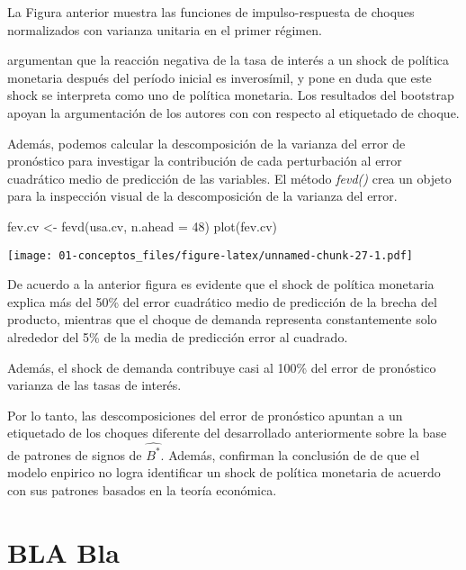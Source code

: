 \documentclass[
]{book}
\newenvironment{Shaded}{\begin{snugshade}}{\end{snugshade}}
\newcommand{\AttributeTok}[1]{\textcolor[rgb]{0.77,0.63,0.00}{#1}}
\newcommand{\DecValTok}[1]{\textcolor[rgb]{0.00,0.00,0.81}{#1}}
\newcommand{\FunctionTok}[1]{\textcolor[rgb]{0.00,0.00,0.00}{#1}}
\newcommand{\NormalTok}[1]{#1}
\newcommand{\OtherTok}[1]{\textcolor[rgb]{0.56,0.35,0.01}{#1}}
\begin{document}
La Figura anterior muestra las funciones de impulso-respuesta de choques normalizados con varianza unitaria en el primer régimen.

\citet{Herwartz2016} argumentan que la reacción negativa de la tasa de interés a un shock de política monetaria después del período inicial es inverosímil, y pone en duda que este shock se interpreta como uno de política monetaria. Los resultados del bootstrap apoyan la argumentación de los autores con
con respecto al etiquetado de choque.

Además, podemos calcular la descomposición de la varianza del error de pronóstico para investigar la contribución de cada perturbación al error cuadrático medio de predicción de las variables. El método \emph{fevd()}
crea un objeto para la inspección visual de la descomposición de la varianza del error.

\begin{Shaded}
\begin{Highlighting}[]
\NormalTok{fev.cv }\OtherTok{\textless{}{-}} \FunctionTok{fevd}\NormalTok{(usa.cv, }\AttributeTok{n.ahead =} \DecValTok{48}\NormalTok{)}
\FunctionTok{plot}\NormalTok{(fev.cv)}
\end{Highlighting}
\end{Shaded}

\texttt{[image: 01-conceptos\_files/figure-latex/unnamed-chunk-27-1.pdf]}

De acuerdo a la anterior figura es evidente que el shock de política monetaria explica más del 50\% del error cuadrático medio de predicción de la brecha del producto, mientras que el choque de demanda representa constantemente solo alrededor del 5\% de la media de predicción
error al cuadrado.

Además, el shock de demanda contribuye casi al 100\% del error de pronóstico
varianza de las tasas de interés.

Por lo tanto, las descomposiciones del error de pronóstico apuntan a un
etiquetado de los choques diferente del desarrollado anteriormente sobre la base de patrones de signos de \(\hat{B^{*}}\). Además, confirman la conclusión de \citet{Herwartz2016} de que el modelo enpirico no logra identificar un shock de política monetaria de acuerdo con sus patrones basados en la teoría económica.

\hypertarget{bla-bla}{%
\section{BLA Bla}\label{bla-bla}}
\end{document}

